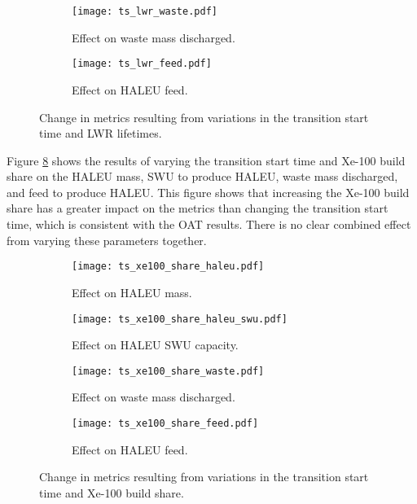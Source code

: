 \begin{figure}
    \ContinuedFloat    
    \begin{subfigure}[t]{0.48\textwidth}
        \centering
        \texttt{[image: ts\_lwr\_waste.pdf]}
        \caption{Effect on waste mass discharged.}
        \label{fig:ts_lwr_waste}
    \end{subfigure}
    \hfill
    \begin{subfigure}[t]{0.48\textwidth}
        \centering
        \texttt{[image: ts\_lwr\_feed.pdf]}
        \caption{Effect on HALEU feed.}
        \label{fig:ts_lwr_feed}
    \end{subfigure}
    \caption{Change in metrics resulting from variations in the 
    transition start time and LWR lifetimes.}
    \label{fig:ts_lwr}
\end{figure}

Figure \ref{fig:ts_xe100_share} shows the results of varying the 
transition start time and Xe-100 build share on the \gls{HALEU} mass, 
\gls{SWU} to produce \gls{HALEU}, waste mass discharged, and feed 
to produce \gls{HALEU}. This figure shows that increasing the 
Xe-100 build share has a greater impact on the metrics than 
changing the transition start time, which is consistent with the 
\gls{OAT} results. There is no clear combined effect from varying these 
parameters together. 

\begin{figure}
    \begin{subfigure}[t]{0.48\textwidth}
        \centering
        \texttt{[image: ts\_xe100\_share\_haleu.pdf]}
        \caption{Effect on HALEU mass.}
        \label{fig:ts_xe100_share_haleu}
    \end{subfigure}
    \begin{subfigure}[t]{0.48\textwidth}
        \centering
        \texttt{[image: ts\_xe100\_share\_haleu\_swu.pdf]}
        \caption{Effect on HALEU SWU capacity.}
        \label{fig:ts_xe100_share_haleu_swu}
    \end{subfigure}
    
    \begin{subfigure}[t]{0.48\textwidth}
        \centering
        \texttt{[image: ts\_xe100\_share\_waste.pdf]}
        \caption{Effect on waste mass discharged.}
        \label{fig:ts_xe100_share_waste}
    \end{subfigure}
    \hfill
    \begin{subfigure}[t]{0.48\textwidth}
        \centering
        \texttt{[image: ts\_xe100\_share\_feed.pdf]}
        \caption{Effect on HALEU feed.}
        \label{fig:ts_xe100_share_feed}
    \end{subfigure}
    \caption{Change in metrics resulting from variations in the 
    transition start time and Xe-100 build share.}
    \label{fig:ts_xe100_share}
\end{figure}

